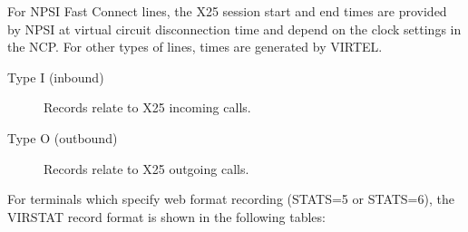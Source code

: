 \documentclass[letterpaper,10pt,english]{sphinxmanual}
\begin{document}
\begin{sphinxVerbatim}[commandchars=\\\{\}]
                
               
               
            
               
             
                 
\end{sphinxVerbatim}


For NPSI Fast Connect lines, the X25 session start and end times are provided by NPSI at virtual circuit disconnection time and depend on the clock settings in the NCP. For other types of lines, times are     generated by VIRTEL.
\begin{description}
\item[{Type I (inbound)}] \leavevmode
Records relate to X25 incoming calls.

\item[{Type O (outbound)}] \leavevmode
Records relate to X25 outgoing calls.

\end{description}

For terminals which specify web format recording (STATS=5 or STATS=6), the VIRSTAT record format is shown in the following  tables:
\end{document}
